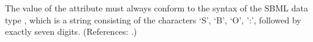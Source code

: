 The value of the attribute  must always conform to the
syntax of the SBML data type , which is a string consisting
of the characters `S', `B', `O', ':', followed by exactly seven digits.
(References: .)

